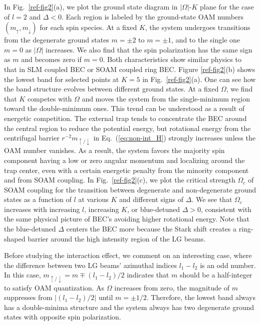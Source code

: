 \documentclass[twocolumn,pra,unsortedaddress,showpacs,floatfix,citeautoscript,nofootinbib]{revtex4-1}
\begin{document}
In Fig.~\ref{ref-fig2}(a), we plot the ground state diagram in
$|\Omega |$-$K$ plane for the case of $l=2$ and $\Delta <0$. Each
region is labeled by the ground-state OAM numbers $(m_{\uparrow
},m_{\downarrow })$ for each spin species. At a fixed $K$, the
system undergoes transitions from the degenerate ground states
$m=\pm 2$ to $m=\pm 1$, and to the single one $m=0$ as $|\Omega |$
increases. We also find that the spin polarization has the same
sign as $m$ and becomes zero if $m=0$. Both characteristics show
similar physics to that in SLM coupled BEC or SOAM coupled ring
BEC. Figure \ref{ref-fig2}(b) shows the lowest band for selected
points at $K=5$ in Fig.~\ref{ref-fig2}(a). One can see how the
band structure evolves between different ground states. At a fixed
$\Omega $, we find that $K$ competes with $\Omega $ and moves the
system from the single-minimum region toward the double-minimum
ones. This trend can be understood as a result of energetic
competition. The external trap tends to concentrate the BEC around
the central region to reduce the potential energy, but rotational
energy from the centrifugal barrier $r^{-2}m_{\uparrow /\downarrow
}$ in Eq.~(\ref{eq:non-int_H}) strongly increases unless the OAM
number vanishes. As a result, the system favors the majority spin
component having a low or zero angular momentum and localizing
around the trap center, even with a certain energetic penalty from
the minority component and from SOAM coupling. In
Fig.~\ref{ref-fig2}(c), we plot the critical strength $\Omega
_{c}$ of SOAM coupling for the transition between degenerate and
non-degenerate ground states as a function of $l$ at various $K$
and different signs of $\Delta $. We see that $\Omega _{c}$
increases with increasing $l$, increasing $K$, or blue-detuned
$\Delta >0$, consistent with the same physical picture of BEC's
avoiding higher rotational energy. Note that the blue-detuned
$\Delta $ centers the BEC more because the Stark shift creates a
ring-shaped barrier around the high intensity region of the LG
beams.

Before studying the interaction effect, we comment on an
interesting case, where the difference between two LG beams'
azimuthal indices $l_{1}-l_{2}$ is an odd number. In this case,
$m_{\uparrow /\downarrow }=m\mp (l_{1}-l_{2})/2$ indicates that
$m$ should be a half-integer to satisfy OAM quantization. As
$\Omega $ increases from zero, the magnitude of $m$ suppresses
from $|(l_{1}-l_{2})/2|$ until $m=\pm 1/2$. Therefore, the lowest
band always has a double-minima structure and the system always
has two degenerate ground states with opposite spin polarization.
\end{document}
